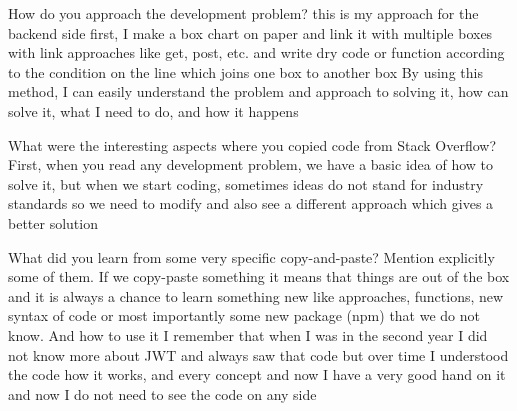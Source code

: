 How do you approach the development problem?
this is my approach for the backend side
first, I make a box chart on paper and link it with multiple boxes with link approaches like get, post, etc.
and write dry code or function according to the condition on the line which joins one box to another box
By using this method, I can easily understand the problem and approach to solving it, how can solve it, what I need to do, and how it happens

What were the interesting aspects where you copied code from Stack Overflow?
First, when you read any development  problem, we have a basic idea of how to solve it, but when we start coding, 
sometimes ideas do not stand for industry standards so we need to 
modify and  also see a different approach which gives a better solution 

What did you learn from some very specific copy-and-paste? Mention explicitly some
of them.
If we copy-paste something it means that things are out of the box and it is always a chance to learn something new like approaches, functions, new syntax of code or most importantly some new package (npm) that we do not know. And how to use it 
I remember that when I was in the second year I did not know more about JWT and always saw that code but over time I understood the code how it works, and every concept and now I have a very good hand on it and now I do not need to see the code on any side 
